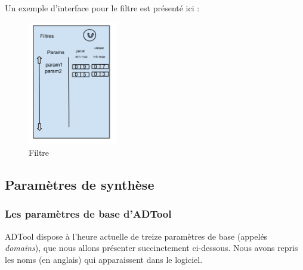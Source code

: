 		Un exemple d'interface pour le filtre est présenté ici :

		\begin{figure}[h!]
			\begin{center}
				\includegraphics[width=0.35\textwidth]{figure/filtre.png}
			\end{center}
			\caption{Filtre}
			\label{fig:filtre}
		\end{figure}

\subsection{Paramètres de synthèse}

\subsubsection{Les paramètres de base d'ADTool}
\label{subsec::ParamBase}

ADTool dispose à l'heure actuelle de treize paramètres de base (appelés \textit{domains}), que nous allons présenter succinctement ci-dessous. Nous avons repris les noms (en anglais) qui apparaissent dans le logiciel. 
		
